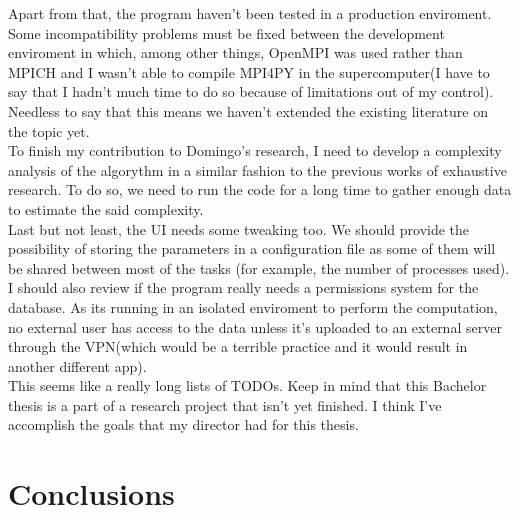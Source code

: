 \documentclass{tfg_domingo}
\begin{document}
  Apart from that, the program haven't been tested in a production enviroment.
  Some incompatibility problems must be fixed between the development
  enviroment in which, among other things, OpenMPI was used rather than
  MPICH and I wasn't able to compile MPI4PY in the supercomputer(I have to
  say that I hadn't much time to do so because of limitations out of
  my control). Needless to say that this means we haven't extended the
  existing literature on the topic yet.\\

  To finish my contribution to Domingo's research, I need to develop a
  complexity analysis of the algorythm in a similar fashion to the previous
  works of exhaustive research. To do so, we need to run the code for a long
  time to gather enough data to estimate the said complexity.\\

  Last but not least, the UI needs some tweaking too. We should provide the
  possibility of storing the parameters in a configuration file as some of
  them will be shared between most of the tasks (for example, the number of
  processes used). I should also review if the program really needs a
  permissions system for the database. As its running in an isolated
  enviroment to perform the computation, no external user has access to the
  data unless it's uploaded to an external server through the VPN(which would
  be a terrible practice and it would result in another different app).\\

  This seems like a really long lists of TODOs. Keep in mind that this
  Bachelor thesis is a part of a research project that isn't yet finished. I
  think I've accomplish the goals that my director had for this thesis.

\chapter{Conclusions}
\end{document}
